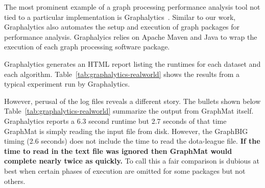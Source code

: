 \documentclass[conference]{IEEEtran}
\begin{document}
The most prominent example of a graph processing performance analysis tool not tied to a particular implementation is Graphalytics~\cite{Capota:2015:Graphalytics}. Similar to our work, Graphalytics also automates the setup and execution of graph packages for performance analysis. Graphalyics relies on Apache Maven and Java to wrap the execution of each graph processing software package.

Graphalytics generates an HTML report listing the runtimes for each dataset and each algorithm. Table~\ref{tab:graphalytics-realworld} shows the results from a typical experiment run by Graphalytics.

However, perusal of the log files reveals a different story. The bullets shown below Table~\ref{tab:graphalytics-realworld} summarize the output from GraphMat itself. Graphalytics reports a 6.3 second runtime but 2.7 seconds of that time GraphMat is simply reading the input file from disk. However, the GraphBIG timing (2.6 seconds) does not include the time to read the dota-league file. \textbf{If the time to read in the text file was ignored then GraphMat would complete nearly twice as quickly.} To call this a fair comparison is dubious at best when certain phases of execution are omitted for some packages but not others.
\end{document}
